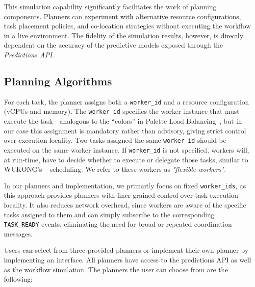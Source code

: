 This simulation capability significantly facilitates the work of planning components. Planners can experiment with alternative resource configurations, task placement policies, and co-location strategies without executing the workflow in a live environment. The fidelity of the simulation results, however, is directly dependent on the accuracy of the predictive models exposed through the \textit{Predictions API}.

\subsection{Planning Algorithms}
\label{ss:planning_algorithms}

For each task, the planner assigns both a \texttt{worker\_id} and a resource configuration (vCPUs and memory). The \texttt{worker\_id} specifies the worker instance that must execute the task—analogous to the “colors” in Palette Load Balancing~\cite{palette_load_balancing}, but in our case this assignment is mandatory rather than advisory, giving strict control over execution locality. Two tasks assigned the same \texttt{worker\_id} should be executed on the same worker instance. If \texttt{worker\_id} is not specified, workers will, at run-time, have to decide whether to execute or delegate those tasks, similar to WUKONG's ~\cite{wukong_2} scheduling. We refer to these workers as \textit{"flexible workers"}. 

In our planners and implementation, we primarily focus on fixed \texttt{worker\_ids}, as this approach provides planners with finer-grained control over task execution locality. It also reduces network overhead, since workers are aware of the specific tasks assigned to them and can simply subscribe to the corresponding \texttt{TASK\_READY} events, eliminating the need for broad or repeated coordination messages.

Users can select from three provided planners or implement their own planner by implementing an interface. All planners have access to the predictions API as well as the workflow simulation. The planners the user can choose from are the following:

